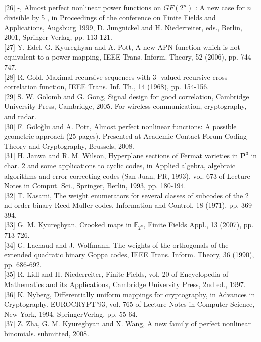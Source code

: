 \documentclass[10pt]{article}
\begin{document}
[26] -, Almost perfect nonlinear power functions on $G F\left(2^{n}\right)$ : A new case for $n$ divisible by 5 , in Proceedings of the conference on Finite Fields and Applications, Augsburg 1999, D. Jungnickel and H. Niederreiter, eds., Berlin, 2001, Springer-Verlag, pp. 113-121.\\[0pt]
[27] Y. Edel, G. Kyureghyan and A. Pott, A new APN function which is not equivalent to a power mapping, IEEE Trans. Inform. Theory, 52 (2006), pp. 744-747.\\[0pt]
[28] R. Gold, Maximal recursive sequences with 3 -valued recursive cross-correlation function, IEEE Trans. Inf. Th., 14 (1968), pp. 154-156.\\[0pt]
[29] S. W. Golomb and G. Gong, Signal design for good correlation, Cambridge University Press, Cambridge, 2005. For wireless communication, cryptography, and radar.\\[0pt]
[30] F. Göloğlu and A. Pott, Almost perfect nonlinear functions: A possible geometric approach (25 pages). Presented at Academic Contact Forum Coding Theory and Cryptography, Brussels, 2008.\\[0pt]
[31] H. Janwa and R. M. Wilson, Hyperplane sections of Fermat varieties in $\mathbf{P}^{3}$ in char. 2 and some applications to cyclic codes, in Applied algebra, algebraic algorithms and error-correcting codes (San Juan, PR, 1993), vol. 673 of Lecture Notes in Comput. Sci., Springer, Berlin, 1993, pp. 180-194.\\[0pt]
[32] T. Kasami, The weight enumerators for several classes of subcodes of the 2 nd order binary Reed-Muller codes, Information and Control, 18 (1971), pp. 369-394.\\[0pt]
[33] G. M. Kyureghyan, Crooked maps in $\mathbb{F}_{2^{n}}$, Finite Fields Appl., 13 (2007), pp. 713-726.\\[0pt]
[34] G. Lachaud and J. Wolfmann, The weights of the orthogonals of the extended quadratic binary Goppa codes, IEEE Trans. Inform. Theory, 36 (1990), pp. 686-692.\\[0pt]
[35] R. Lidl and H. Niederreiter, Finite Fields, vol. 20 of Encyclopedia of Mathematics and its Applications, Cambridge University Press, 2nd ed., 1997.\\[0pt]
[36] K. Nyberg, Differentially uniform mappings for cryptography, in Advances in Cryptography. EUROCRYPT'93, vol. 765 of Lecture Notes in Computer Science, New York, 1994, SpringerVerlag, pp. 55-64.\\[0pt]
[37] Z. Zha, G. M. Kyureghyan and X. Wang, A new family of perfect nonlinear binomials. submitted, 2008.
\end{document}
